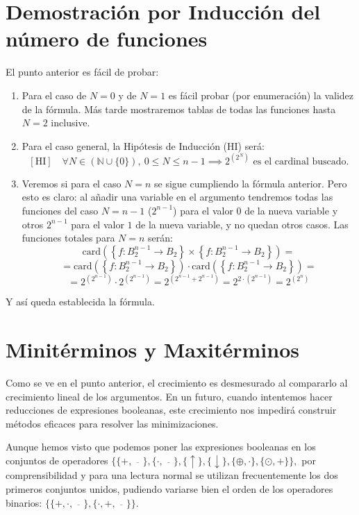 \section{Demostración por Inducción del número de funciones}

El punto anterior es fácil de probar:

\begin{enumerate}
    \item Para el caso de $N = 0$ y de $N = 1$ es fácil probar (por enumeración) la validez de la fórmula. Más tarde mostraremos tablas de todas las funciones hasta $N = 2$ inclusive.
    \item Para el caso general, la Hipótesis de Inducción (HI) será:
    \[
    [\mathrm{HI}] \quad \forall N \in (\mathbb{N} \cup \{0\}), \ 0 \leq N \leq n - 1 \implies 2^{(2^{N})} \text{ es el cardinal buscado.}
    \]
    \item Veremos si para el caso $N = n$ se sigue cumpliendo la fórmula anterior. Pero esto es claro: al añadir una variable en el argumento tendremos todas las funciones del caso $N = n - 1$ ($2^{n - 1}$) para el valor $0$ de la nueva variable y otros $2^{n - 1}$ para el valor $1$ de la nueva variable, y no quedan otros casos. Las funciones totales para $N = n$ serán:
    \[
    \mathrm{card} \left( \left\{ f: B_{2}^{n - 1} \rightarrow B_{2} \right\} \times \left\{ f: B_{2}^{n - 1} \rightarrow B_{2} \right\} \right) =
    \]
    \[
    = \mathrm{card} \left( \left\{ f: B_{2}^{n - 1} \rightarrow B_{2} \right\} \right) \cdot \mathrm{card} \left( \left\{ f: B_{2}^{n - 1} \rightarrow B_{2} \right\} \right) =
    \]
    \[
    = 2^{(2^{n - 1})} \cdot 2^{(2^{n - 1})} = 2^{(2^{n - 1} + 2^{n - 1})} = 2^{2 \cdot (2^{n - 1})} = 2^{(2^{n})}
    \]
\end{enumerate}

Y así queda establecida la fórmula.

\section{Minitérminos y Maxitérminos}

Como se ve en el punto anterior, el crecimiento es desmesurado al compararlo al crecimiento lineal de los argumentos. En un futuro, cuando intentemos hacer reducciones de expresiones booleanas, este crecimiento nos impedirá construir métodos eficaces para resolver las minimizaciones.

Aunque hemos visto que podemos poner las expresiones booleanas en los conjuntos de operadores $\{ \{+, \overline{\quad}\}, \{\cdot, \overline{\quad}\}, \{\uparrow\}, \{\downarrow\}, \{\oplus, \cdot\}, \{\odot, +\} \},$ por comprensibilidad y para una lectura normal se utilizan frecuentemente los dos primeros conjuntos unidos, pudiendo variarse bien el orden de los operadores binarios: $\{ \{+, \cdot, \overline{\quad}\}, \{\cdot, +, \overline{\quad}\} \}.$ 

